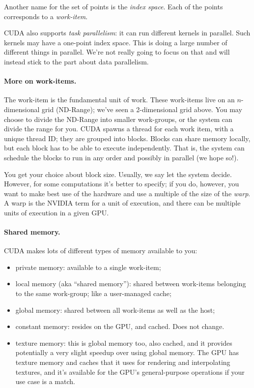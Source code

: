 \begin{center}
\end{center}

Another name for the set of points is the \emph{index space}. 
Each of the points corresponds to a \emph{work-item}.

CUDA also supports \emph{task parallelism}: it can run different
kernels in parallel. Such kernels may have a one-point index space. This is
doing a large number of different things in parallel. We're not really going
to focus on that and will instead stick to the part about data parallelism.

\paragraph{More on work-items.} The work-item is the fundamental
unit of work. These work-items live on an $n$-dimensional
grid (ND-Range); we've seen a 2-dimensional grid above. You may choose
to divide the ND-Range into smaller work-groups, or the system can
divide the range for you. CUDA spawns a thread for each work item,
with a unique thread ID; they are grouped into blocks. Blocks can share 
memory locally, but each block has to be able to execute independently.
That is, the system can schedule the blocks to run in any order and possibly
in parallel (we hope so!). 

You get your choice about block size. Usually, we say let the system decide. However, for some computations it's better to specify; if you do, however, you want to make best use of the hardware and use a multiple of the size of the \textit{warp}. A warp is the NVIDIA term for a unit of execution, and there can be multiple units of execution in a given GPU.

\paragraph{Shared memory.} CUDA makes lots of different types of
memory available to you:

\begin{itemize}
\item private memory: available to a single work-item;
\item local memory (aka ``shared memory''): shared between work-items
  belonging to the same work-group; like a user-managed cache;
\item global memory: shared between all work-items as well as the host;
\item constant memory: resides on the GPU, and cached. Does not change.
\item texture memory: this is global memory too, also cached, and it provides potentially a very slight speedup over using global memory. The GPU has texture memory and caches that it uses for rendering and interpolating textures, and it's available for the GPU's general-purpose operations if your use case is a match. 
\end{itemize}

